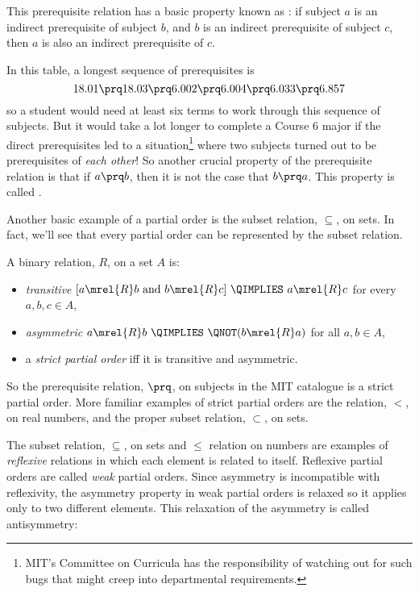 This prerequisite relation has a basic property known as
: if subject $a$ is an indirect prerequisite of subject
$b$, and $b$ is an indirect prerequisite of subject $c$, then $a$ is also
an indirect prerequisite of $c$.

In this table, a longest sequence of prerequisites is
\[
18.01 \prq 18.03 \prq 6.002 \prq 6.004 \prq 6.033 \prq 6.857
\]
so a student would need at least six terms to work through this sequence
of subjects.  But it would take a lot longer to complete a Course 6 major
if the direct prerequisites led to a situation\footnote{MIT's Committee on
Curricula has the responsibility of watching out for such bugs that might
creep into departmental requirements.} where two subjects turned out to be
prerequisites of \emph{each other}!  So another crucial property of the
prerequisite relation is that if $a \prq b$, then it is not the case that
$b \prq a$.  This property is called .

Another basic example of a partial order is the subset relation,
$\subseteq$, on sets.  In fact, we'll see that every partial order can be
represented by the subset relation.

\begin{definition}
A binary relation, $R$, on a set $A$ is:
\begin{itemize}

\item \emph{transitive} \qiff 
$[a \mrel{R}  b \text{ and } b \mrel{R}  c]\ \QIMPLIES\  a \mrel{R}  c$
\quad for every $a,b,c\in A$,

\item \emph{asymmetric} \qiff
$a \mrel{R}  b\  \QIMPLIES\  \QNOT(b \mrel{R}  a)$
\quad for all $a,b\in A$,

\item a \emph{strict partial order} iff it is transitive and asymmetric.
\end{itemize}

\end{definition}

So the prerequisite relation, $\prq$, on subjects in the MIT catalogue is
a strict partial order.  More familiar examples of strict partial orders
are the relation, $<$, on real numbers, and the proper subset relation,
$\subset$, on sets.

The subset relation, $\subseteq$, on sets and $\leq$ relation on numbers
are examples of \emph{reflexive} relations in which each element is
related to itself.  Reflexive partial orders are called \emph{weak}
partial orders.  Since asymmetry is incompatible with reflexivity, the
asymmetry property in weak partial orders is relaxed so it applies only to
two different elements.  This relaxation of the asymmetry is called
antisymmetry:

